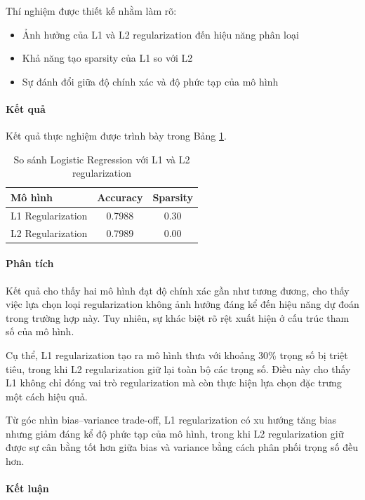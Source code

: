 Thí nghiệm được thiết kế nhằm làm rõ:
\begin{itemize}
    \item Ảnh hưởng của L1 và L2 regularization đến hiệu năng phân loại
    \item Khả năng tạo sparsity của L1 so với L2
    \item Sự đánh đổi giữa độ chính xác và độ phức tạp của mô hình
\end{itemize}

\paragraph{Kết quả}

Kết quả thực nghiệm được trình bày trong Bảng \ref{tab:l1_l2_result}.

\begin{table}[htbp]
\centering
\begin{tabular}{lcc}
\hline
\textbf{Mô hình} & \textbf{Accuracy} & \textbf{Sparsity} \\
\hline
L1 Regularization & 0.7988 & 0.30 \\
L2 Regularization & 0.7989 & 0.00 \\
\hline
\end{tabular}
\caption{So sánh Logistic Regression với L1 và L2 regularization}
\label{tab:l1_l2_result}
\end{table}

\paragraph{Phân tích}

Kết quả cho thấy hai mô hình đạt độ chính xác gần như tương đương, cho thấy việc lựa chọn loại regularization không ảnh hưởng đáng kể đến hiệu năng dự đoán trong trường hợp này. Tuy nhiên, sự khác biệt rõ rệt xuất hiện ở cấu trúc tham số của mô hình.

Cụ thể, L1 regularization tạo ra mô hình thưa với khoảng 30\% trọng số bị triệt tiêu, trong khi L2 regularization giữ lại toàn bộ các trọng số. Điều này cho thấy L1 không chỉ đóng vai trò regularization mà còn thực hiện lựa chọn đặc trưng một cách hiệu quả.

Từ góc nhìn bias–variance trade-off, L1 regularization có xu hướng tăng bias nhưng giảm đáng kể độ phức tạp của mô hình, trong khi L2 regularization giữ được sự cân bằng tốt hơn giữa bias và variance bằng cách phân phối trọng số đều hơn.

\paragraph{Kết luận}

